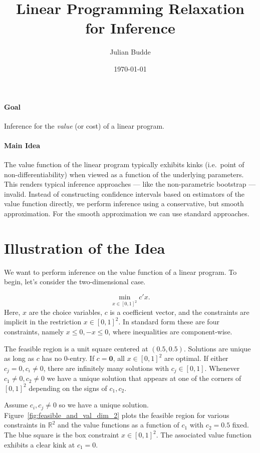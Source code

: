 \documentclass[11pt,a4paper,english]{article} %
\title{Linear Programming Relaxation for Inference}
\author{Julian Budde}
\date{\today}
\numberwithin{equation}{section}
\numberwithin{figure}{section}
\numberwithin{table}{section}
\theoremstyle{definition}
\theoremstyle{remark}
\begin{document}
\maketitle

\paragraph{Goal} Inference for the \textit{value} (or cost) of a linear program.

\paragraph{Main Idea} The value function of the linear program typically exhibits kinks (i.e.~point of non-differentiability) when viewed as a function of the underlying parameters.
This renders typical inference approaches --- like the non-parametric bootstrap --- invalid.
Instead of constructing confidence intervals based on estimators of the value function directly, we perform inference using a conservative, but smooth approximation.
For the smooth approximation we can use standard approaches.

\section{Illustration of the Idea}

We want to perform inference on the value function of a linear program.
To begin, let's consider the two-dimensional case.

\begin{equation}
	\min_{x\in [0,1]^2} c'x.
\end{equation}
Here, $x$ are the choice variables, $c$ is a coefficient vector, and the constraints are implicit in the restriction $x \in [0,1]^2$.
In standard form these are four constraints, namely $x \leq 0, -x \leq 0$, where inequalities are component-wise.

The feasible region is a unit square centered at $(0.5, 0.5)$. Solutions are unique as long as $c$ has no $0$-entry.
If $c=\mathbf{0}$, all $x\in [0,1]^2$ are optimal. If either $c_j = 0, c_i\neq0$, there are infinitely many solutions with $c_j \in [0,1]$.
Whenever $c_1\neq0, c_2\neq0$ we have a unique solution that appears at one of the corners of $[0,1]^2$ depending on the signs of $c_1, c_2$.

Assume $c_i, c_j \neq 0$ so we have a unique solution.
Figure~\ref{fig:feasible_and_val_dim_2} plots the feasible region for various constraints in $\mathbb{R}^2$ and the value functions as a function of $c_1$ with $c_2=0.5$ fixed.
The blue square is the box constraint $x\in[0,1]^2$.
The associated value function exhibits a clear kink at $c_1 = 0$.
\end{document}
